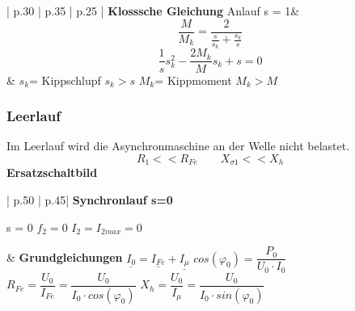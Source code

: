 \begin{longtable}{| p{.30\textwidth} | p{.35\textwidth} | p{.25\textwidth} |}
        \textbf{Klosssche Gleichung}\newline
        Anlauf \rightarrow s = 1&
        \[ \frac{M}{M_k}=\frac{2}{\frac{s}{s_k}+\frac{s_k}{s}} \]
        \[ \frac{1}{s} s_k^2 - \frac{2 M_k}{M}s_k+s=0 \]&
        $ s_k $= Kippschlupf\newline
        $ s_k > s $\newline
        $ M_k $= Kippmoment\newline
        $ M_k > M$
        \\ \hline        
              
    \end{longtable}
\clearpage
    \subsubsection{Leerlauf}
    \begin{multicols}{2}
        \begin{minipage}{\linewidth}
            Im Leerlauf wird die Asynchronmaschine an der \newline Welle nicht belastet.
            \[ R_1 << R_{Fe} \qquad X_{\sigma 1} << X_h\]
            \textbf{Ersatzschaltbild}\newline
        \end{minipage}
        
        \begin{minipage}{\linewidth}
        \end{minipage}
    \end{multicols} 
    \begin{longtable}{| p{.50\textwidth} | p{.45\textwidth}|}
        \hline
         \textbf{Synchronlauf \quad s=0} \newline
         \begin{minipage}{0.5\linewidth}    
         s = 0 \newline
         $ f_2 = 0 $\newline
         $ I_2 = I_{2max} = 0$\newline\newline
        \end{minipage}
         &
         \textbf{Grundgleichungen}\newline
         $ \underline{I_0}=\underline{I_{Fe}} + \underline{I_\mu} $\newline
          $ cos(\varphi_0)= \dfrac{P_0}{U_0 \cdot I_0} $\newline
          $ R_{Fe}=\dfrac{U_0}{I_{Fe}}=\dfrac{U_0}{I_0 \cdot cos(\varphi_0)} $\newline
           $ X_h = \dfrac{U_0}{I_\mu}=\dfrac{U_0}{I_0 \cdot sin(\varphi_0)} $
         \\ \hline
    \end{longtable}
    
